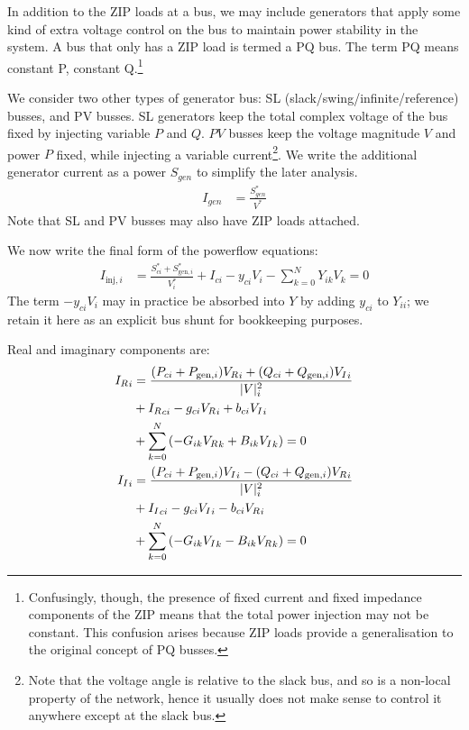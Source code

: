 \documentclass[11pt]{article}
\newcommand{\Vr}{{V_R}}
\newcommand{\Vi}{{V_I}}
\newcommand{\Ir}{{I_R}}
\newcommand{\Ii}{{I_I}}
\begin{document}
In addition to the ZIP loads at a bus, we may include generators that apply some kind of extra voltage control on the bus to maintain power stability in the system. A bus that only has a ZIP load is termed a PQ bus. The term PQ means constant P, constant Q.\footnote{Confusingly, though, the presence of fixed current and fixed impedance components of the ZIP means that the total power injection may not be constant. This confusion arises because ZIP loads provide a generalisation to the original concept of PQ busses.}

We consider two other types of generator bus: SL (slack/swing/infinite/reference) busses, and PV busses. SL generators keep the total complex voltage of the bus fixed by injecting variable $P$ and $Q$. $PV$ busses keep the voltage magnitude $V$ and power $P$ fixed, while injecting a variable current\footnote{Note that the voltage angle is relative to the slack bus, and so is a non-local property of the network, hence it usually does not make sense to control it anywhere except at the slack bus.}. We write the additional generator current as a power $S_{gen}$ to simplify the later analysis.
\begin{align}
I_{gen} &= \frac{S_{gen}^*}{V^*}
\end{align}
Note that SL and PV busses may also have ZIP loads attached.

We now write the final form of the powerflow equations:
\begin{align}
I_{\text{inj},i} &= \frac{S^*_{ci} + S^*_{\text{gen},i}}{V^*_i} + I_{ci} - y_{ci}V_i - \sum_{k=0}^NY_{ik}V_k = 0
\label{EQ_POWERFLOW_COMPLEX}
\end{align}
The term $-y_{ci}V_i$ may in practice be absorbed into $Y$ by adding $y_{ci}$ to $Y_{ii}$; we retain it here as an explicit bus shunt for bookkeeping purposes.

Real and imaginary components are:
\begin{align}
	\Ir_i &= \frac{(P_{ci} + P_{\text{gen},i})\Vr_i + (Q_{ci} + Q_{\text{gen},i})\Vi_i}{|V|^2_i} \notag \\
	      &+ \Ir_{ci} -g_{ci}\Vr_i + b_{ci}\Vi_i \notag \\
	      &+ \sum_{k=0}^N\left(-G_{ik}\Vr_k + B_{ik}\Vi_k\right) = 0\\
	\Ii_i &= \frac{(P_{ci} + P_{\text{gen},i})\Vi_i - (Q_{ci} + Q_{\text{gen},i})\Vr_i}{|V|^2_i} \notag \\
	      &+ \Ii_{ci} -g_{ci}\Vi_i - b_{ci}\Vr_i \notag \\
	&+ \sum_{k=0}^N\left(-G_{ik}\Vi_k - B_{ik}\Vr_k\right) = 0
\end{align}
\end{document}
